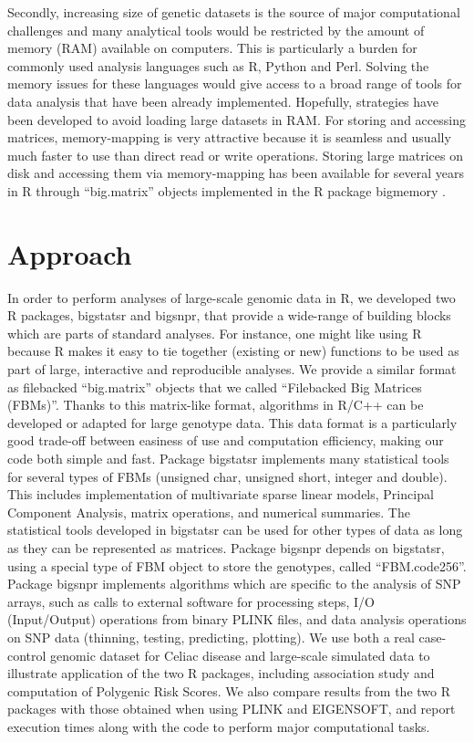 \documentclass{bioinfo}
\begin{document}
Secondly, increasing size of genetic datasets is the source of major computational challenges and many analytical tools would be restricted by the amount of memory (RAM) available on computers. This is particularly a burden for commonly used analysis languages such as R, Python and Perl. Solving the memory issues for these languages would give access to a broad range of tools for data analysis that have been already implemented. Hopefully, strategies have been developed to avoid loading large datasets in RAM. For storing and accessing matrices, memory-mapping is very attractive because it is seamless and usually much faster to use than direct read or write operations. Storing large matrices on disk and accessing them via memory-mapping has been available for several years in R through ``big.matrix'' objects implemented in the R package bigmemory \cite[]{Kane2013}.


\section{Approach}

{\color{red}
In order to perform analyses of large-scale genomic data in R, we developed two R packages, bigstatsr and bigsnpr, that provide a wide-range of building blocks which are parts of standard analyses. 
For instance, one might like using R because R makes it easy to tie together (existing or new) functions to be used as part of large, interactive and reproducible analyses.
We provide a similar format as filebacked ``big.matrix'' objects that we called ``Filebacked Big Matrices (FBMs)''. Thanks to this matrix-like format, algorithms in R/C++ can be developed or adapted for large genotype data. This data format is a particularly good trade-off between easiness of use and computation efficiency, making our code both simple and fast.
}
Package bigstatsr implements many statistical tools for several types of FBMs (unsigned char, unsigned short, integer and double). This includes implementation of multivariate sparse linear models, Principal Component Analysis, matrix operations, and numerical summaries. The statistical tools developed in bigstatsr can be used for other types of data as long as they can be represented as matrices. Package bigsnpr depends on bigstatsr, using a special type of FBM object to store the genotypes, called ``FBM.code256''. Package bigsnpr implements algorithms which are specific to the analysis of SNP arrays, such as calls to external software for processing steps, I/O (Input/Output) operations from binary PLINK files, and data analysis operations on SNP data (thinning, testing, predicting, plotting). 
We use both a real case-control genomic dataset for Celiac disease and large-scale simulated data to illustrate application of the two R packages, including association study and computation of Polygenic Risk Scores. We also compare results from the two R packages with those obtained when using PLINK and EIGENSOFT, and report execution times along with the code to perform major computational tasks.
\end{document}
